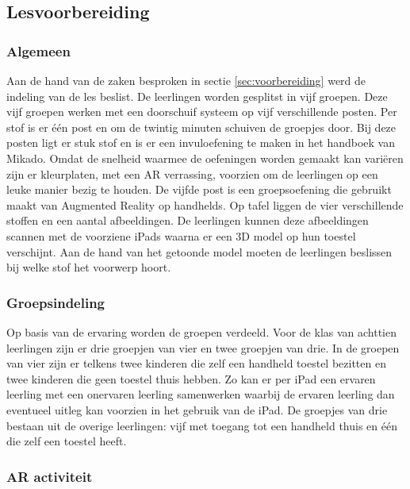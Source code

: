 \documentclass[pdftex,a4paper,12pt,twoside]{report}
\begin{document}
\subsection{Lesvoorbereiding}
\subsubsection{Algemeen}
Aan de hand van de zaken besproken in sectie \ref{sec:voorbereiding} werd de indeling van de les beslist. De leerlingen worden gesplitst in vijf groepen. Deze vijf groepen werken met een doorschuif systeem op vijf verschillende posten. Per stof is er \'e\'en post en om de twintig minuten schuiven de groepjes door. Bij deze posten ligt er stuk stof en is er een invuloefening te maken in het handboek van Mikado. Omdat de snelheid waarmee de oefeningen worden gemaakt kan vari\"eren zijn er kleurplaten, met een AR verrassing, voorzien om de leerlingen op een leuke manier bezig te houden. De vijfde post is een groepsoefening die gebruikt maakt van Augmented Reality op handhelds. Op tafel liggen de vier verschillende stoffen en een aantal afbeeldingen. De leerlingen kunnen deze afbeeldingen scannen met de voorziene iPads waarna er een 3D model op hun toestel verschijnt. Aan de hand van het getoonde model moeten de leerlingen beslissen bij welke stof het voorwerp hoort.\\


\subsubsection{Groepsindeling}
Op basis van de ervaring worden de groepen verdeeld. Voor de klas van achttien leerlingen zijn er drie groepjen van vier en twee groepjen van drie. In de groepen van vier zijn er telkens twee kinderen die zelf een handheld toestel bezitten en twee kinderen die geen toestel thuis hebben. Zo kan er per iPad een ervaren leerling met een onervaren leerling samenwerken waarbij de ervaren leerling dan eventueel uitleg kan voorzien in het gebruik van de iPad. De groepjes van drie bestaan uit de overige leerlingen: vijf met toegang tot een handheld thuis en \'e\'en die zelf een toestel heeft.\\


\subsubsection{AR activiteit}
\end{document}
